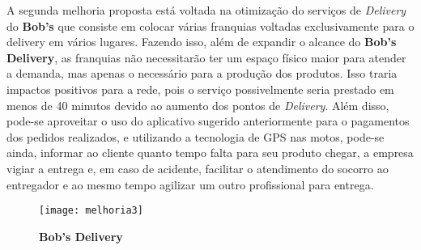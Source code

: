 		A segunda melhoria proposta está voltada na otimização do serviços de \emph{Delivery} do \textbf{Bob's} que consiste em colocar várias franquias voltadas exclusivamente para o delivery em vários lugares. Fazendo isso, além de expandir o alcance do \textbf{Bob's Delivery}, as franquias não necessitarão ter um espaço físico maior para atender a demanda, mas apenas o necessário para a produção dos produtos. Isso traria impactos positivos para a rede, pois o serviço possivelmente seria prestado em menos de 40 minutos devido ao aumento dos pontos de \emph{Delivery}. Além disso, pode-se aproveitar o uso do aplicativo sugerido anteriormente para o pagamentos dos pedidos realizados, e utilizando a tecnologia de GPS nas motos, pode-se ainda, informar ao cliente quanto tempo falta para seu produto chegar, a empresa vigiar a entrega e, em caso de acidente, facilitar o atendimento do socorro ao entregador e ao mesmo tempo agilizar um outro profissional para entrega. 

		\begin{figure}[h]
			\centering
			\texttt{[image: melhoria3]}
			\caption[Bob's Delivery]{\textbf{Bob's Delivery}}
			\label{fig:melhoria3}
		\end{figure}
